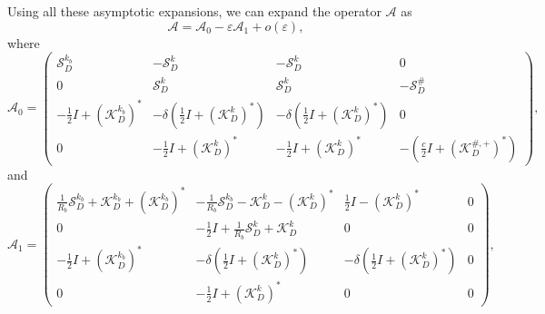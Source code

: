 \documentclass[a4paper]{article}
\theoremstyle{definition}
\newcommand{\A}{\mathcal{A}}
\renewcommand{\S}{\mathcal{S}}
\newcommand{\K}{\mathcal{K}}
\renewcommand{\epsilon}{\varepsilon}
\newcommand{\Scrystal}{\mathcal{S}_D^\#}
\begin{document}
Using all these asymptotic expansions, we can expand the operator $\A$ as 
\begin{equation}
\A = \A_0 - \epsilon \A_1 + o(\epsilon),
\end{equation}
where
\begin{equation} \label{eq:A0}
\A_0 = 
\begin{pmatrix}
\S_{D}^{k_b} &  -\S_{D}^{k} & -\S_{D}^{k} & 0 \\
0 & \S_{D}^k & \S_{D}^k & -\Scrystal \\
-\frac{1}{2}I+ (\K_{D}^{k_b})^*& -\delta\left( \frac{1}{2}I+ (\K_{D}^{k})^*\right) & -\delta\left( \frac{1}{2}I+ (\K_{D}^{k})^*\right) & 0 \\
0 & -\frac{1}{2}I+ (\K_D^{k})^* & -\frac{1}{2}I+ (\K_D^{k})^* & -\left( \frac{c}{2}I+ \left(\K_D^{\#,+}\right)^*\right)
\end{pmatrix}, 
\end{equation}
and
\begin{equation} \label{eq:A1}
\A_1 = 
\begin{pmatrix}
\frac{1}{R_b}\S_D^{k_b} + \K_D^{k_b} + \left(\K_D^{k_b}\right)^* &  -\frac{1}{R_b}\S_D^{k_b} - \K_D^{k} - \left(\K_D^{k}\right)^* & \frac{1}{2}I - \left(\K_D^k\right)^* & 0 \\
0 & -\frac{1}{2}I+ \frac{1}{R_b}\S_D^k + \K_D^k  & 0 & 0 \\
-\frac{1}{2}I+ (\K_{D}^{k_b})^*& -\delta\left( \frac{1}{2}I+ (\K_{D}^{k})^*\right) & -\delta\left( \frac{1}{2}I+ (\K_{D}^{k})^*\right) & 0 \\
0 & -\frac{1}{2}I+ (\K_D^{k})^* & 0 & 0
\end{pmatrix}, 
\end{equation}

{}

\end{document}
